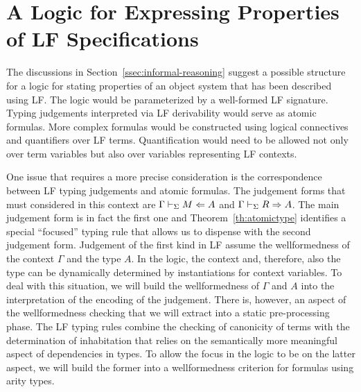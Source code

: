 \section{A Logic for Expressing Properties of LF Specifications}
\label{sec:logic}

The discussions in Section~\ref{ssec:informal-reasoning} suggest a 
possible structure for a logic for stating properties of an object
system that has been described using LF. 
%
The logic would be parameterized by a well-formed LF signature.
%
Typing judgements interpreted via LF derivability would serve as 
atomic formulas.
%
More complex formulas would be constructed using 
logical connectives and quantifiers over LF terms.
%
Quantification would need to be allowed not only over term variables
but also over variables representing LF contexts. 

One issue that requires a more precise consideration is the
correspondence between LF typing judgements and atomic
formulas. 
%
The judgement forms that must considered in this context 
are $\Gamma \vdash_{\Sigma} M\Leftarrow A$ and $\Gamma \vdash_{\Sigma} R\Rightarrow A$.
%
The main judgement form is in fact the first one and
Theorem~\ref{th:atomictype} identifies a special
``focused'' typing rule that allows us to dispense with the second
judgement form.  
%
Judgement of the first kind in LF assume the wellformedness of the
context $\Gamma$ and the type $A$.
%
In the logic, the context and, therefore, also the type can be
dynamically determined by instantiations for context variables.
%
To deal with this situation, we will build the wellformedness of
$\Gamma$ and $A$ into the interpretation of the encoding of the
judgement. 
%
There is, however, an aspect of the wellformedness checking that we
will extract into a static pre-processing phase.
%
The LF typing rules combine the checking of canonicity of terms with
the determination of inhabitation that relies on the semantically more
meaningful aspect of dependencies in types.
%
To allow the focus in the logic to be on the latter aspect, we will
build the former into a wellformedness criterion for formulas using
arity types.

